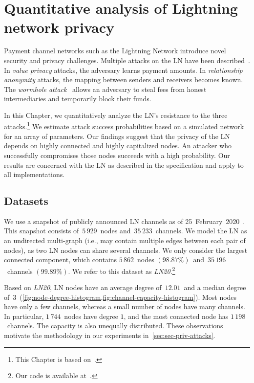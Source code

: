 \chapter{Quantitative analysis of Lightning network privacy}

\label{Chapter07LNattacks}

Payment channel networks such as the Lightning Network introduce novel security and privacy challenges.
Multiple attacks on the LN have been described~\cite{Malavolta2017}.
In \textit{value privacy} attacks, the adversary learns payment amounts.
In \textit{relationship anonymity} attacks, the mapping between senders and receivers becomes known.
The \textit{wormhole attack}~\cite{Malavolta2019} allows an adversary to steal fees from honest intermediaries and temporarily block their funds.

In this Chapter, we quantitatively analyze the LN's resistance to the three attacks.\footnote{This Chapter is based on~\cite{Tikhomirov2020a}.}
We estimate attack success probabilities based on a simulated network for an array of parameters.
Our findings suggest that the privacy of the LN depends on highly connected and highly capitalized nodes.
An attacker who successfully compromises those nodes succeeds with a high probability.
Our results are concerned with the LN as described in the specification and apply to all implementations.


\section{Datasets}
\label{sec:datasets}

We use a snapshot of publicly announced LN channels as of 25~February~2020~\cite{fiatjaf2020}.
This snapshot consists of~$5\,929$~nodes and~$35\,233$~channels.
We model the LN as an undirected multi-graph (i.e., may contain multiple edges between each pair of nodes), as two LN nodes can share several channels.
We only consider the largest connected component, which contains $5\,862$~nodes $(98.87\%)$~and~$35\,196$~channels $(99.89\%)$.
We refer to this dataset as \emph{LN20}.\footnote{Our code is available at~\cite{Tikhomirov2019}.}

Based on \emph{LN20}, LN nodes have an average degree of~$12.01$~and a median degree of~$3$~(\cref{fig:node-degree-histogram,fig:channel-capacity-histogram}).
Most nodes have only a few channels, whereas a small number of nodes have many channels.
In particular, $1\,744$~nodes have degree $1$, and the most connected node has $1\,198$~channels.
The capacity is also unequally distributed.
These observations motivate the methodology in our experiments in~\cref{sec:sec-priv-attacks}.

